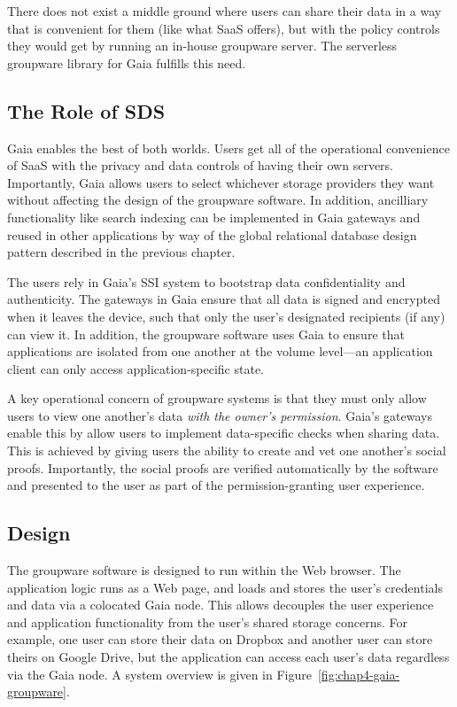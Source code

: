 There does not exist a middle ground where users can share their data in a way
that is convenient for them (like what SaaS offers), but with the policy
controls they would get by running an in-house groupware server.  The serverless
groupware library for Gaia fulfills this need.

\subsection{The Role of SDS}

Gaia enables the best of both worlds.  Users get all of the
operational convenience of SaaS with the privacy and data controls of having
their own servers.  Importantly, Gaia allows users to select whichever storage
providers they want without affecting the design of the groupware software. 
In addition, ancilliary functionality like search indexing can be
implemented in Gaia gateways and reused in other applications by way of the
global relational database design pattern described in the previous chapter.

The users rely in Gaia's SSI system to bootstrap data confidentiality and
authenticity.  The gateways in Gaia ensure that all data is signed and encrypted
when it leaves the device, such that only the user's designated recipients (if
any) can view it.  In addition, the groupware software uses Gaia to ensure that
applications are isolated from one another at the volume level---an application
client can only access application-specific state.

A key operational concern of groupware systems is that they must only allow
users to view one another's data \emph{with the owner's permission}.  Gaia's
gateways enable this by allow users to implement data-specific checks when sharing
data.  This is achieved by giving users the ability to create and vet one
another's social proofs.  Importantly, the social proofs are verified
automatically by the software and presented to the user as part of the
permission-granting user experience.

\subsection{Design}

The groupware software is designed to run within the Web browser.  The
application logic runs as a Web page, and loads and stores the user's
credentials and data via a colocated Gaia node.  This allows decouples the
user experience and application functionality from the user's shared
storage concerns.  For example, one user can store their data on Dropbox and
another user can store theirs on Google Drive, but the application can access
each user's data regardless via the Gaia node.  A system overview is given
in Figure~\ref{fig:chap4-gaia-groupware}.

